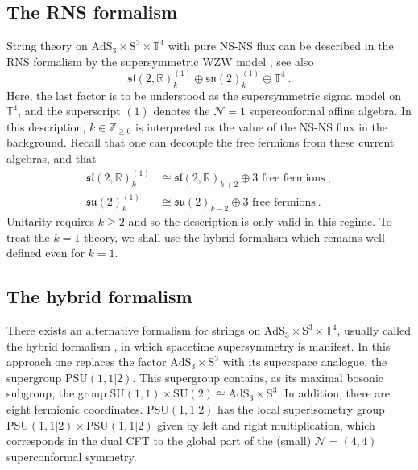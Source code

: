 \documentclass[12pt,a4paper]{article}
\newcommand{\be}{\begin{equation}}
\newcommand{\ee}{\end{equation}}
\begin{document}
\subsection{The RNS formalism} \label{subsec:RNS}
String theory on $\mathrm{AdS}_3 \times \mathrm{S}^3 \times \mathbb{T}^4$ with pure NS-NS flux can be described in the RNS formalism by the supersymmetric WZW model \cite{Giveon:1998ns, Maldacena:2000hw, Maldacena:2000kv, Maldacena:2001km}, see also \cite{Israel:2003ry,Raju:2007uj,Ferreira:2017pgt}
\be 
\mathfrak{sl}(2,\mathds{R})^{(1)}_k \oplus \mathfrak{su}(2)_{k}^{(1)}\oplus\mathbb{T}^4 \ . 
\ee
Here, the last factor is to be understood as the supersymmetric sigma model on $\mathbb{T}^4$, and the superscript $(1)$ denotes the $\mathcal{N}=1$ superconformal affine algebra. In this description, $k \in \mathds{Z}_{\ge 0}$ is interpreted as the value of the NS-NS flux in the background.
Recall that one can decouple the free fermions from these current algebras, and that 
\begin{align} 
\mathfrak{sl}(2,\mathds{R})^{(1)}_k &\cong \mathfrak{sl}(2,\mathds{R})_{k+2} \oplus \text{3 free fermions}\ , \\
\mathfrak{su}(2)^{(1)}_k &\cong \mathfrak{su}(2)_{k-2} \oplus \text{3 free fermions}\ .
\end{align}
Unitarity requires $k \ge 2$ and so the description is only valid in this regime. To treat the $k=1$ theory, we shall use the hybrid formalism which remains well-defined even for $k=1$.

\subsection{The hybrid formalism} \label{subsec:hybrid formalism}
There exists an alternative formalism for strings on $\mathrm{AdS}_3 \times \mathrm{S}^3 \times \mathbb{T}^4$, usually called the hybrid formalism \cite{Berkovits:1999im}, in which spacetime supersymmetry is manifest. In this approach one replaces the factor $\mathrm{AdS}_3 \times \mathrm{S}^3$ with its superspace analogue, the supergroup $\mathrm{PSU}(1,1|2)$. This supergroup contains, as its maximal bosonic subgroup, the group $\mathrm{SU}(1,1) \times \mathrm{SU}(2) \cong \mathrm{AdS}_3 \times \mathrm{S}^3$. In addition, there are eight fermionic coordinates. $\mathrm{PSU}(1,1|2)$ has the local superisometry group $\mathrm{PSU}(1,1|2) \times \mathrm{PSU}(1,1|2)$ given by left and right multiplication, which corresponds in the dual CFT to the global part of the (small) 
$\mathcal{N}=(4,4)$ superconformal symmetry.
\end{document}
